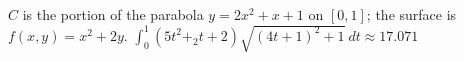 {$C$ is the portion of the parabola $y=2x^2+x+1$ on $[0,1]$; the surface is $f(x,y)=x^2+2y$.
}
{$\int_0^1(5t^2+_2t+2)\sqrt{(4t+1)^2+1}\ dt \approx 17.071$
}

